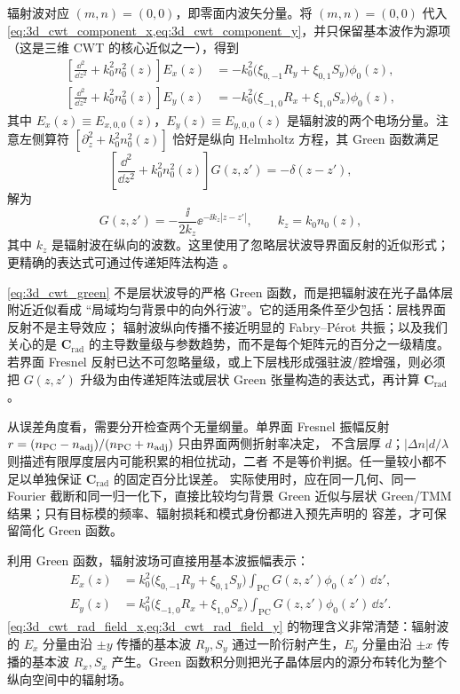 辐射波对应 $(m,n)=(0,0)$，即零面内波矢分量。将 $(m,n)=(0,0)$ 代入 \cref{eq:3d_cwt_component_x,eq:3d_cwt_component_y}，并只保留基本波作为源项（这是三维 CWT 的核心近似之一），得到
\begin{align}
\left[\frac{\dd^2}{\dd z^2}+k_0^2 n_0^2(z)\right]E_x(z)
&= -k_0^2\bigl(\xi_{0,-1}R_y + \xi_{0,1}S_y\bigr)\phi_0(z),
\label{eq:3d_cwt_rad_eq_x}\\
\left[\frac{\dd^2}{\dd z^2}+k_0^2 n_0^2(z)\right]E_y(z)
&= -k_0^2\bigl(\xi_{-1,0}R_x + \xi_{1,0}S_x\bigr)\phi_0(z),
\label{eq:3d_cwt_rad_eq_y}
\end{align}
其中 $E_x(z)\equiv E_{x,0,0}(z)$，$E_y(z)\equiv E_{y,0,0}(z)$ 是辐射波的两个电场分量。注意左侧算符 $[\partial_z^2+k_0^2 n_0^2(z)]$ 恰好是纵向 Helmholtz 方程，其 Green 函数满足
\begin{equation}
\left[\frac{\dd^2}{\dd z^2}+k_0^2 n_0^2(z)\right]G(z,z') = -\delta(z-z'),
\label{eq:3d_cwt_green_def}
\end{equation}
解为
\begin{equation}
G(z,z') = -\frac{\ii}{2k_z}\ee^{-\ii k_z|z-z'|},
\qquad k_z = k_0 n_0(z),
\label{eq:3d_cwt_green}
\end{equation}
其中 $k_z$ 是辐射波在纵向的波数。这里使用了忽略层状波导界面反射的近似形式；更精确的表达式可通过传递矩阵法构造 \cite{liang2012square}。

\begin{RigorousBox}
\cref{eq:3d_cwt_green} 不是层状波导的严格 Green 函数，而是把辐射波在光子晶体层附近近似看成
“局域均匀背景中的向外行波”。它的适用条件至少包括：层栈界面反射不是主导效应；
辐射波纵向传播不接近明显的 Fabry--P\'erot 共振；以及我们关心的是
$\bm C_{\mathrm{rad}}$ 的主导数量级与参数趋势，而不是每个矩阵元的百分之一级精度。
若界面 Fresnel 反射已达不可忽略量级，或上下层栈形成强驻波/腔增强，则必须把
$G(z,z')$ 升级为由传递矩阵法或层状 Green 张量构造的表达式，再计算
$\bm C_{\mathrm{rad}}$。

从误差角度看，需要分开检查两个无量纲量。单界面 Fresnel 振幅反射
$r=(n_{\rm PC}-n_{\rm adj})/(n_{\rm PC}+n_{\rm adj})$ 只由界面两侧折射率决定，
不含层厚 $d$；$|\Delta n|d/\lambda$ 则描述有限厚度层内可能积累的相位扰动，二者
不是等价判据。任一量较小都不足以单独保证 $\bm C_{\mathrm{rad}}$ 的固定百分比误差。
实际使用时，应在同一几何、同一 Fourier 截断和同一归一化下，直接比较均匀背景 Green
近似与层状 Green/TMM 结果；只有目标模的频率、辐射损耗和模式身份都进入预先声明的
容差，才可保留简化 Green 函数。
\end{RigorousBox}

利用 Green 函数，辐射波场可直接用基本波振幅表示：
\begin{align}
E_x(z) &= k_0^2\bigl(\xi_{0,-1}R_y + \xi_{0,1}S_y\bigr)\int_{\mathrm{PC}} G(z,z')\phi_0(z')\,\dd z',
\label{eq:3d_cwt_rad_field_x}\\
E_y(z) &= k_0^2\bigl(\xi_{-1,0}R_x + \xi_{1,0}S_x\bigr)\int_{\mathrm{PC}} G(z,z')\phi_0(z')\,\dd z'.
\label{eq:3d_cwt_rad_field_y}
\end{align}
\cref{eq:3d_cwt_rad_field_x,eq:3d_cwt_rad_field_y} 的物理含义非常清楚：辐射波的 $E_x$ 分量由沿 $\pm y$ 传播的基本波 $R_y,S_y$ 通过一阶衍射产生，$E_y$ 分量由沿 $\pm x$ 传播的基本波 $R_x,S_x$ 产生。Green 函数积分则把光子晶体层内的源分布转化为整个纵向空间中的辐射场。

